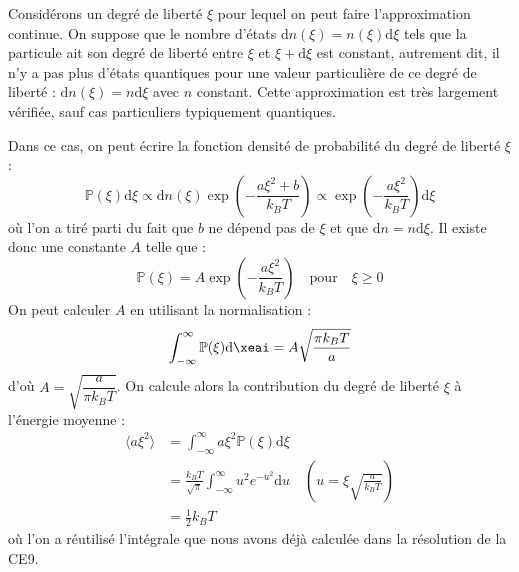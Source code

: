 \documentclass[11pt,fleqn]{book} %
\newcommand{\dd}{\mathrm{d}}
\begin{document}
\begin{demonstration}

Considérons un degré de liberté $\xi$ pour lequel on peut faire l'approximation continue. On suppose que le nombre d'états $\dd n(\xi) = n(\xi) \dd \xi$ tels que la particule ait son degré de liberté entre $\xi$ et $\xi + \dd \xi$ est constant, autrement dit, il n'y a pas plus d'états quantiques pour une valeur particulière de ce degré de liberté : $\dd n(\xi) = n \dd \xi$ avec $n$ constant. Cette approximation est très largement vérifiée, sauf cas particuliers typiquement quantiques.

Dans ce cas, on peut écrire la fonction densité de probabilité du degré de liberté $\xi$ :
\begin{equation}
	\mathbb{P}(\xi) \dd \xi \propto \dd n(\xi) \exp \left(-\frac{a \xi^2 + b}{k_B T}\right) \propto \exp \left(-\frac{a \xi^2}{k_B T}\right) \dd \xi
\end{equation}
où l'on a tiré parti du fait que $b$ ne dépend pas de $\xi$ et que $\dd n = n \dd \xi$. 
Il existe donc une constante $A$ telle que :
\begin{equation}
	\mathbb{P}(\xi) = A \exp\left(-\frac{a \xi^2}{k_B T}\right) \quad \mathrm{pour} \quad \xi \ge 0
\end{equation}
On peut calculer $A$ en utilisant la normalisation :
\begin{equation}
	\int_{-\infty}^\infty \mathbb{P}(\xi) \dd \xeai = A \sqrt{ \dfrac{\pi k_B T}{a}}
\end{equation}
d'où $A = \sqrt{\dfrac{a}{\pi k_B T}}$. On calcule alors la contribution du degré de liberté $\xi$ à l'énergie moyenne :
\begin{align}
	\langle a \xi^2 \rangle &= \int_{-\infty}^{\infty} a \xi^2 \mathbb{P}(\xi) \dd \xi \\
	&= \frac{k_B T}{\sqrt{\pi}} \int_{-\infty}^{\infty} u^2 e^{-u^2} \dd u \quad \left( u = \xi \sqrt{\frac{a}{k_B T}} \right) \\
	&= \frac{1}{2} k_B T
\end{align}
où l'on a réutilisé l'intégrale que nous avons déjà calculée dans la résolution de la CE9.
\end{demonstration}
\end{document}
